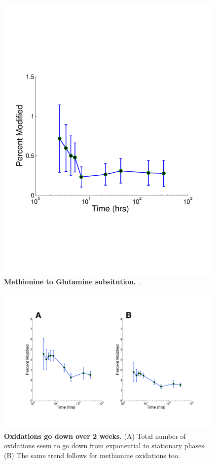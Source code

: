 \documentclass[12pt]{article}
\begin{document}
\clearpage
\begin{figure}[p]
\centerline{\includegraphics[width=5in]{Figures/MetGluTimeCourse.pdf}}
\caption{\label{fig:Phos}\textbf{Methionine to Glutamine subsitution.} .}
\end{figure}


\clearpage
\begin{figure}[p]
\centerline{\includegraphics[width=8in]{Figures/Oxidations.pdf}}
\caption{\label{fig:Oxid}\textbf{Oxidations go down over 2 weeks.} (A) Total number of oxidations seem to go down from exponential to stationary phases. (B) The same trend follows for methionine oxidations too.}
\end{figure}
\end{document}
